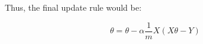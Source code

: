 \documentclass{article}
\begin{document}
Thus, the final update rule would be:

\begin{equation*}
\theta = \theta - \alpha \frac{1}{m} X(X\theta - Y)
\end{equation*}

\pagebreak

%
% 
%
%
%
%
%
%
%
%
\end{document}
